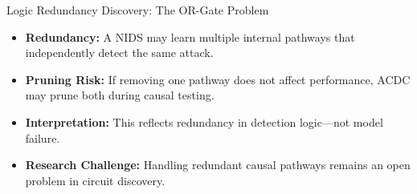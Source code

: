 \documentclass{beamer}
\begin{document}
		
			
			
	
	\begin{frame}{Logic Redundancy Discovery: The OR-Gate Problem}
		\begin{itemize}
			
			\item \justifying \textbf{Redundancy:}
			A NIDS may learn multiple internal pathways that independently detect the same attack.
			
			\item \justifying \textbf{Pruning Risk:}
			If removing one pathway does not affect performance, ACDC may prune both during causal testing.
			
			\item \justifying \textbf{Interpretation:}
			This reflects redundancy in detection logic—not model failure.
			
			\item \textbf{Research Challenge:}
			Handling redundant causal pathways remains an open problem in circuit discovery.
		\end{itemize}
	\end{frame}
	
\end{document}
